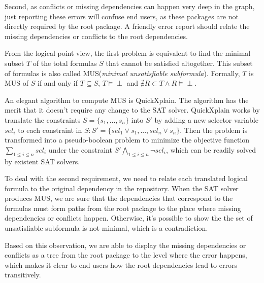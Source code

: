Second, as conflicts or missing dependencies can happen very deep in the graph, just reporting these errors will confuse end users, as these packages are not directly required by the root package. A friendly error report should relate the missing dependencies or conflicts to the root dependencies.

From the logical point view, the first problem is equivalent to find the minimal subset $T$ of the total formulas $S$ that cannot be satisfied altogether. This subset of formulas is also called MUS(\emph{minimal unsatisfiable subformula}). Formally, $T$ is MUS of $S$ if and only if $T \subseteq S$, $T \vDash \perp$ and $\nexists R \subset T \wedge R \vDash \perp$.

An elegant algorithm to compute MUS is QuickXplain\cite{junker2004quickxplain}. The algorithm has the merit that it doesn't require any change to the SAT solver. QuickXplain works by translate the constraints $S = \{ s_1, ..., s_n\}$ into $S'$ by adding a new selector variable $sel_i$ to each constraint in $S: S' = \{ sel_1 \vee s_1, ..., sel_n \vee s_n\}$. Then the problem is transformed into a pseudo-boolean problem to minimize the objective function $\sum_{1 \leq i \leq n} sel_i$ under the constraint $S' \bigwedge_{1 \leq i \leq n} \neg sel_i$, which can be readily solved by existent SAT solvers.

To deal with the second requirement, we need to relate each translated logical formula to the original dependency in the repository. When the SAT solver produces MUS, we are sure that the dependencies that correspond to the formulas must form paths from the root package to the place where missing dependencies or conflicts happen. Otherwise, it's possible to show the the set of unsatisfiable subformula is not minimal, which is a contradiction.

Based on this observation, we are able to display the missing dependencies or conflicts as a tree from the root package to the level where the error happens, which makes it clear to end users how the root dependencies lead to errors transitively.
